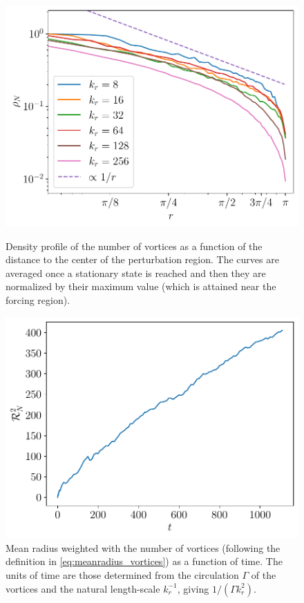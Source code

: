 \documentclass[../main.tex]{subfiles}
\begin{document}
\begin{figure}[ht]
	\centering
	\begin{minipage}[t]{0.44\textwidth}
		\centering
		\includegraphics[width=\textwidth]{images/NumVortices.pdf}
		\caption{Density profile of the number of vortices as a function of the distance to the center of the perturbation region. The curves are averaged once a stationary state is reached and then they are normalized by their maximum value (which is attained near the forcing region).
		}\label{fig:numvortices}
	\end{minipage}\hspace{0.04\textwidth}
	\begin{minipage}[t]{0.44\textwidth}
		\centering
		\includegraphics[width=\textwidth]{images/NumVorticesMeanRadius.pdf}
		\caption{Mean radius weighted with the number of vortices (following the definition in \cref{eq:meanradius_vortices}) as a function of time. The units of time are those determined from the circulation $\Gamma$ of the vortices and the natural length-scale $k_r^{-1}$, giving $1/(\Gamma k_r^2)$.}\label{fig:numvortices_meanradius}
	\end{minipage}
\end{figure}
\end{document}
